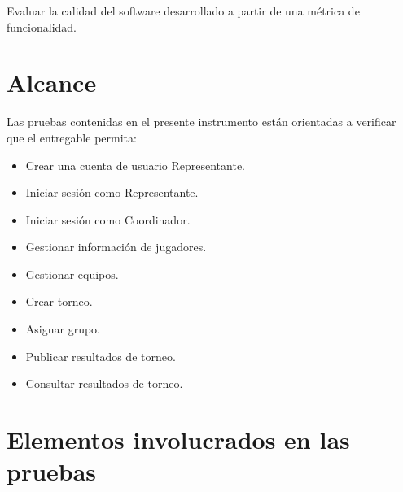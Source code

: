 \documentclass[oneside,10pt]{book}
\begin{document}
	Evaluar la calidad del software desarrollado a partir de una métrica de funcionalidad.

\section{Alcance}

	Las pruebas contenidas en el presente instrumento están orientadas a verificar que el entregable permita:

\begin{itemize}
\item Crear una cuenta de usuario Representante.
\item Iniciar sesión como Representante.
\item Iniciar sesión como Coordinador.
\item Gestionar información de jugadores.
\item Gestionar equipos.
\item Crear torneo.
\item Asignar grupo.
\item Publicar resultados de torneo.
\item Consultar resultados de torneo.
\end{itemize}

\section{Elementos involucrados en las pruebas}
\end{document}
